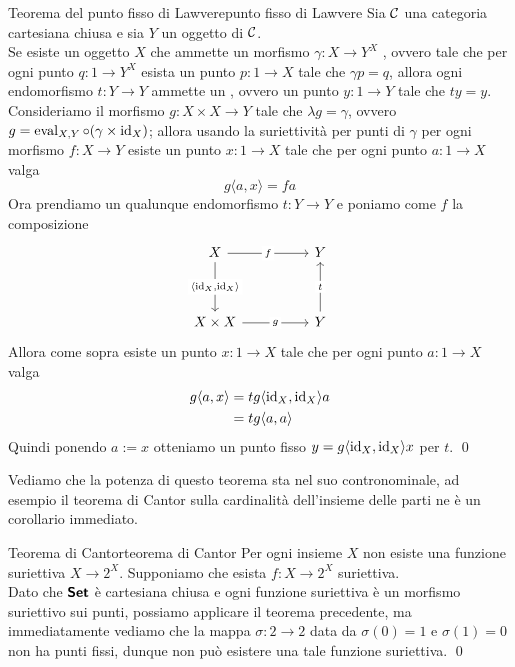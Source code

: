 \documentclass[openany]{book}
\renewcommand\C{\mc{C}}
\begin{document}
\begin{theorem}{Teorema del punto fisso di Lawvere}{punto fisso di Lawvere}
    Sia $\C$ una categoria cartesiana chiusa e sia $Y$ un oggetto di $\C$.\\
    Se esiste un oggetto $X$ che ammette un morfismo $\gamma : X\to Y^X$ , ovvero tale che per ogni punto $q:1\to Y^X$ esista un punto $p: 1\to X$ tale che $\gamma p = q$, allora ogni endomorfismo $t:Y\to Y$ ammette un , ovvero un punto $y:1\to Y$ tale che $ty = y$.
    \proof 
    Consideriamo il morfismo $g : X\times X\to Y$ tale che $\lambda g = \gamma$, ovvero $g = \operatorname{eval}_{X,Y}\circ(\gamma \times \operatorname{id}_X)$; allora usando la suriettività per punti di $\gamma$ per ogni morfismo $f: X\to Y$ esiste un punto $x: 1\to X$ tale che per ogni punto $a:1\to X$ valga
    \[ g  \langle a, x\rangle = f a \] 
    Ora prendiamo un qualunque endomorfismo $t:Y\to Y$ e poniamo come $f$ la composizione 
    \[\begin{tikzcd}
    	X && Y \\
	    \\
	    {X\times X} && Y
	    \arrow["f"{description}, from=1-1, to=1-3]
	    \arrow["{\langle \id_X, \id_X \rangle}"{description}, from=1-1, to=3-1]
	    \arrow["g"{description}, from=3-1, to=3-3]
	    \arrow["t"{description}, from=3-3, to=1-3]
    \end{tikzcd}\]
    Allora come sopra esiste un punto $x:1\to X$ tale che per ogni punto $a:1\to X$ valga 
    \begin{align*}
        g \langle a, x\rangle & = t g \langle \operatorname{id}_X, \operatorname{id}_X\rangle a \\
        & = t g \langle a, a\rangle
    \end{align*}
    Quindi ponendo $a:= x$ otteniamo un punto fisso $y = g \langle \operatorname{id}_X, \operatorname{id}_X\rangle x $ per $t$.
    \qed 
\end{theorem}

Vediamo che la potenza di questo teorema sta nel suo contronominale, ad esempio il teorema di Cantor sulla cardinalità dell'insieme delle parti ne è un corollario immediato.

\begin{corollary}{Teorema di Cantor}{teorema di Cantor}
    Per ogni insieme $X$ non esiste una funzione suriettiva $X\to 2^X$.
    \proof 
    Supponiamo che esista $f:X\to 2^X$ suriettiva.\\
    Dato che $\text{\sffamily\textbf{Set}}$ è cartesiana chiusa e ogni funzione suriettiva è un morfismo suriettivo sui punti, possiamo applicare il teorema precedente, ma immediatamente vediamo che la mappa $\sigma:2\to 2$ data da $\sigma(0) = 1$ e $\sigma(1)=0$ non ha punti fissi, dunque non può esistere una tale funzione suriettiva.
    \qed
\end{corollary}
\end{document}
